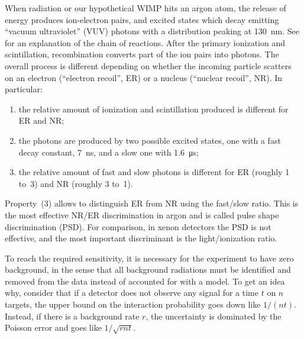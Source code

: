 
When radiation or our hypothetical WIMP hits an argon atom, the release of
energy produces ion-electron pairs, and excited states which decay emitting
``vacuum ultraviolet'' (VUV) photons with a distribution peaking at
\SI{130}{nm}. See \cite[ch.~2, sec.~3.4]{aprile2006} for an explanation of the
chain of reactions. After the primary ionization and scintillation,
recombination converts part of the ion pairs into photons. The overall process
is different depending on whether the incoming particle scatters on an electron
(``electron recoil'', ER) or a nucleus (``nuclear recoil'', NR). In particular:
%
\begin{enumerate}
    
    \item the relative amount of ionization and scintillation produced is
    different for ER and NR;
    
    \item the photons are produced by two possible excited states, one with
    a fast decay constant, \SI{7}{ns}, and a slow one with \SI{1.6}{\micro s};
    
    \item the relative amount of fast and slow photons is different for ER
    (roughly 1 to~3) and NR (roughly 3 to~1).
    
\end{enumerate}

Property~(3) allows to distinguish ER from NR using the fast/slow ratio. This
is the most effective NR/ER discrimination in argon and is called pulse shape
discrimination (PSD). For comparison, in xenon detectors the PSD is not
effective, and the most important discriminant is the light/ionization ratio.

To reach the required sensitivity, it is necessary for the experiment to have
zero background, in the sense that all background radiations must be identified
and removed from the data instead of accounted for with a model. To get an idea
why, consider that if a detector does not observe any signal for a time $t$ on
$n$ targets, the upper bound on the interaction probability goes down like
$1/(nt)$. Instead, if there is a background rate $r$, the uncertainty is
dominated by the Poisson error and goes like $1/\sqrt{rnt}$.

